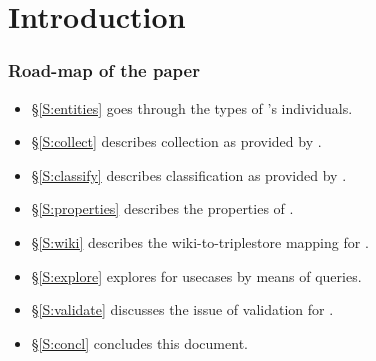 
\section{Introduction}


\subsubsection*{Road-map of the paper}

\begin{itemize}
\item \S\ref{S:entities} goes through the types of \solasote's individuals.
\item \S\ref{S:collect} describes collection as provided by \solasote.
\item \S\ref{S:classify} describes classification as provided by \solasote.
\item \S\ref{S:properties} describes the properties of \solasote.
\item \S\ref{S:wiki} describes the wiki-to-triplestore mapping for \solasote.
\item \S\ref{S:explore} explores \solasote{} for usecases by means of queries.
\item \S\ref{S:validate} discusses the issue of validation for \solasote.
\item \S\ref{S:concl} concludes this document.
\end{itemize}


